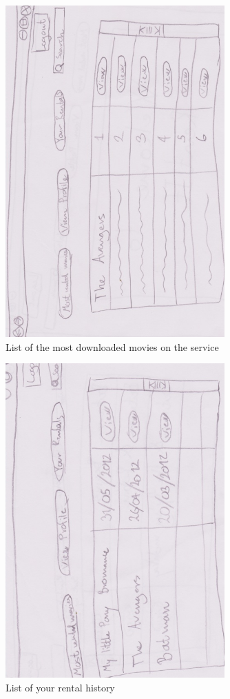 \begin{figure}[!ht]
  \centering
    \includegraphics[width=0.75\textwidth]{Parts/Appendix/Images/PaperMockup/MostDownloaded}
  \caption{List of the most downloaded movies on the service}
  \label{fig:Appendix_GUI_sketches_MostDownloaded}
\end{figure}

\begin{figure}[!ht]
  \centering
    \includegraphics[width=0.75\textwidth]{Parts/Appendix/Images/PaperMockup/RentalHistory}
  \caption{List of your rental history}
  \label{fig:Appendix_GUI_sketches_RentalHistory}
\end{figure}

